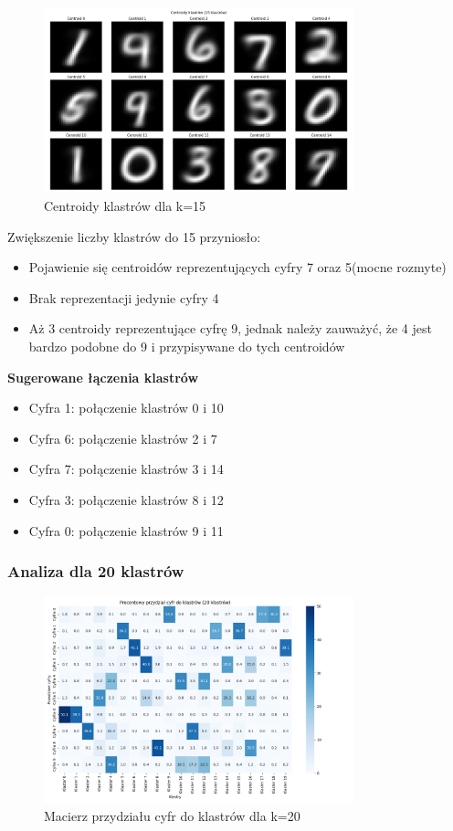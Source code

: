 \documentclass[12pt,a4paper]{article}
\begin{document}
\begin{figure}[H]
\centering
\includegraphics[width=0.8\textwidth]{img/centroidy15.png}
\caption{Centroidy klastrów dla k=15}
\end{figure}

Zwiększenie liczby klastrów do 15 przyniosło:
\begin{itemize}
    \item Pojawienie się centroidów reprezentujących cyfry 7 oraz 5(mocne rozmyte)
    \item Brak reprezentacji jedynie cyfry 4
    \item Aż 3 centroidy reprezentujące cyfrę 9, jednak należy zauważyć, że 4 jest bardzo podobne do 9 i przypisywane do tych centroidów
\end{itemize}

\noindent \textbf{Sugerowane łączenia klastrów}
\begin{itemize}
    \item Cyfra 1: połączenie klastrów 0 i 10
    \item Cyfra 6: połączenie klastrów 2 i 7
    \item Cyfra 7: połączenie klastrów 3 i 14
    \item Cyfra 3: połączenie klastrów 8 i 12
    \item Cyfra 0: połączenie klastrów 9 i 11
\end{itemize}

\subsubsection{Analiza dla 20 klastrów}

\begin{figure}[H]
\centering
\includegraphics[width=0.8\textwidth]{img/macierz20.png}
\caption{Macierz przydziału cyfr do klastrów dla k=20}
\end{figure}
\end{document}
